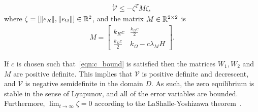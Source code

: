\documentclass[10pt,fleqn]{IJCAS}  %
\begin{document}
\begin{multicols}{2}
\begin{gather*}
	\dot{\mathcal{V}} \leq -\zeta^T M \zeta ,
\end{gather*}
where $\zeta=[\|e_R\|,\|e_\Omega\|]\in\mathbb{R}^2$, and the matrix \( M \in \mathbb{R}^{2 \times 2} \) is 
\begin{gather*}
	M = \begin{bmatrix}
		k_R c & \frac{k_\Omega c}{2} \\
		\frac{k_\Omega c}{2} & k_\Omega - c \lambda_M H
	\end{bmatrix} .
\end{gather*}

If \( c \) is chosen such that~\cref{eqn:c_bound} is satisfied then the matrices \( W_1, W_2 \) and \( M \) are positive definite.
This implies that $\mathcal{V}$ is positive definite and decrescent, and $\dot{\mathcal{V}}$ is negative semidefinite in the domain $D$. As such, the zero equilibrium is stable in the sense of Lyapunov, and all of the error variables are bounded. Furthermore, $\lim_{t\to\infty} \zeta=0$ according to the LaShalle-Yoshizawa theorem~\cite{khalil1996}. 

%	
%	


\end{multicols}
\end{document}
